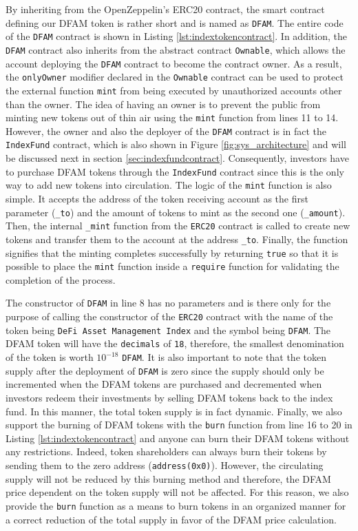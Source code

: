 By inheriting from the OpenZeppelin's ERC20 contract, the smart contract defining our DFAM token is rather short and is named as \texttt{DFAM}. The entire code of the \texttt{DFAM} contract is shown in Listing \ref{lst:indextokencontract}. In addition, the \texttt{DFAM} contract also inherits from the abstract contract \texttt{Ownable}, which allows the account deploying the \texttt{DFAM} contract to become the contract owner. As a result, the \texttt{onlyOwner} modifier declared in the \texttt{Ownable} contract can be used to protect the external function \texttt{mint} from being executed by unauthorized accounts other than the owner. The idea of having an owner is to prevent the public from minting new tokens out of thin air using the \texttt{mint} function from lines 11 to 14. However, the owner and also the deployer of the \texttt{DFAM} contract is in fact the \texttt{IndexFund} contract, which is also shown in Figure \ref{fig:sys_architecture} and will be discussed next in section \ref{sec:indexfundcontract}. Consequently, investors have to purchase DFAM tokens through the \texttt{IndexFund} contract since this is the only way to add new tokens into circulation. The logic of the \texttt{mint} function is also simple. It accepts the address of the token receiving account as the first parameter (\texttt{\_to}) and the amount of tokens to mint as the second one (\texttt{\_amount}). Then, the internal \texttt{\_mint} function from the \texttt{ERC20} contract is called to create new tokens and transfer them to the account at the address \texttt{\_to}. Finally, the function signifies that the minting completes successfully by returning \texttt{true} so that it is possible to place the \texttt{mint} function inside a \texttt{require} function for validating the completion of the process. 


The constructor of \texttt{DFAM} in line 8 has no parameters and is there only for the purpose of calling the constructor of the \texttt{ERC20} contract with the name of the token being \texttt{DeFi Asset Management Index} and the symbol being \texttt{DFAM}. The DFAM token will have the \texttt{decimals} of \texttt{18}, therefore, the smallest denomination of the token is worth $10^{-18}$ \texttt{DFAM}. It is also important to note that the token supply after the deployment of \texttt{DFAM} is zero since the supply should only be incremented when the DFAM tokens are purchased and decremented when investors redeem their investments by selling DFAM tokens back to the index fund. In this manner, the total token supply is in fact dynamic.
Finally, we also support the burning of DFAM tokens with the \texttt{burn} function from line 16 to 20 in Listing \ref{lst:indextokencontract} and anyone can burn their DFAM tokens without any restrictions. Indeed, token shareholders can always burn their tokens by sending them to the zero address (\texttt{address(0x0)}). However, the circulating supply will not be reduced by this burning method and therefore, the DFAM price dependent on the token supply will not be affected. For this reason, we also provide the \texttt{burn} function as a means to burn tokens in an organized manner for a correct reduction of the total supply in favor of the DFAM price calculation.


